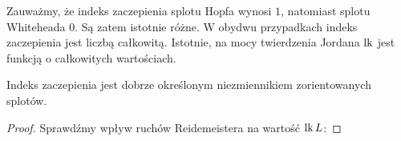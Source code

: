 Zauważmy, że indeks zaczepienia splotu Hopfa wynosi $1$, natomiast splotu Whiteheada $0$.
Są zatem istotnie różne.
W obydwu przypadkach indeks zaczepienia jest liczbą całkowitą.
Istotnie, na mocy twierdzenia Jordana $\operatorname{lk}$ jest funkcją o całkowitych wartościach.

\begin{proposition}
    Indeks zaczepienia jest dobrze określonym niezmiennikiem zorientowanych splotów.
\end{proposition}

\begin{proof}
    Sprawdźmy wpływ ruchów Reidemeistera na wartość $\operatorname{lk} L$:
\begin{comment}
    \[
        \fbox{
        \begin{tikzpicture}[baseline=-0.65ex,scale=0.07]
        \begin{knot}[clip width=5]
        \strand[semithick] (-10,10) .. controls (-10,2) and (-10,2) .. (-6,-2);
        \strand[semithick] (-10,-10) .. controls (-10,-2) and (-10,-1) .. (-9,0);
        \strand[semithick] (-7,1) -- (-6,2);
        \strand[semithick] (-6,2) .. controls (2,9) and (2,-9) .. (-6,-2);
        \end{knot}
        \end{tikzpicture}
        $\stackrel{R_1}{\cong} \,\,$
        \begin{tikzpicture}[baseline=-0.65ex,scale=0.07]
        \begin{knot}[clip width=5]
        \strand[semithick] (0,10) -- (0,-10);
        \end{knot}
        \end{tikzpicture}}
        \quad \fbox{
        \begin{tikzpicture}[baseline=-0.65ex,scale=0.07]
        \begin{knot}[clip width=5]
        \strand[semithick] (4,-10) .. controls (4,-4) and (-4,-4) .. (-4,0);
        \strand[semithick] (4,10) .. controls (4, 4) and (-4, 4) .. (-4,0);
        \strand[semithick] (-4,-10) .. controls (-4,-4) and (4,-4) .. (4,0);
        \strand[semithick] (-4,10) .. controls (-4, 4) and (4,4) .. (4,0);
        \node[blue] at (-4,4)[left] {$a$};
        \node[blue] at (-4,-4)[left] {$-a$};
        \end{knot}
        \end{tikzpicture}
        $\stackrel{R_2}{\cong} \,\,$
        \begin{tikzpicture}[baseline=-0.65ex,scale=0.07]
        \begin{knot}[clip width=5]

\end{comment}
\end{proof}
